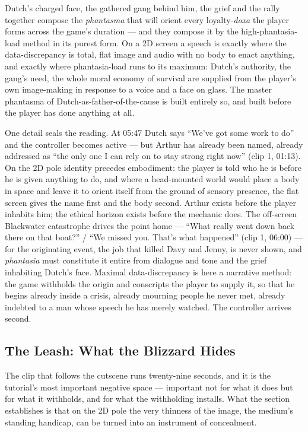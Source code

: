 \documentclass{article}
\begin{document}
Dutch's charged face, the gathered gang behind him, the grief and the rally together compose the \textit{phantasma} that will orient every loyalty-\textit{doxa} the player forms across the game's duration — and they compose it by the high-phantasia-load method in its purest form. On a 2D screen a speech is exactly where the data-discrepancy is total, flat image and audio with no body to enact anything, and exactly where phantasia-load runs to its maximum: Dutch's authority, the gang's need, the whole moral economy of survival are supplied from the player's own image-making in response to a voice and a face on glass. The master phantasma of Dutch-as-father-of-the-cause is built entirely so, and built before the player has done anything at all.

One detail seals the reading. At 05:47 Dutch says ``We've got some work to do'' and the controller becomes active — but Arthur has already been named, already addressed as ``the only one I can rely on to stay strong right now'' (clip 1, 01:13). On the 2D pole identity precedes embodiment: the player is told who he is before he is given anything to do, and where a head-mounted world would place a body in space and leave it to orient itself from the ground of sensory presence, the flat screen gives the name first and the body second. Arthur exists before the player inhabits him; the ethical horizon exists before the mechanic does. The off-screen Blackwater catastrophe drives the point home — ``What really went down back there on that boat?'' / ``We missed you. That's what happened'' (clip 1, 06:00) — for the originating event, the job that killed Davy and Jenny, is never shown, and \textit{phantasia} must constitute it entire from dialogue and tone and the grief inhabiting Dutch's face. Maximal data-discrepancy is here a narrative method: the game withholds the origin and conscripts the player to supply it, so that he begins already inside a crisis, already mourning people he never met, already indebted to a man whose speech he has merely watched. The controller arrives second.

\bigskip

\subsection*{The Leash: What the Blizzard Hides}

The clip that follows the cutscene runs twenty-nine seconds, and it is the tutorial's most important negative space — important not for what it does but for what it withholds, and for what the withholding installs. What the section establishes is that on the 2D pole the very thinness of the image, the medium's standing handicap, can be turned into an instrument of concealment.
\end{document}
